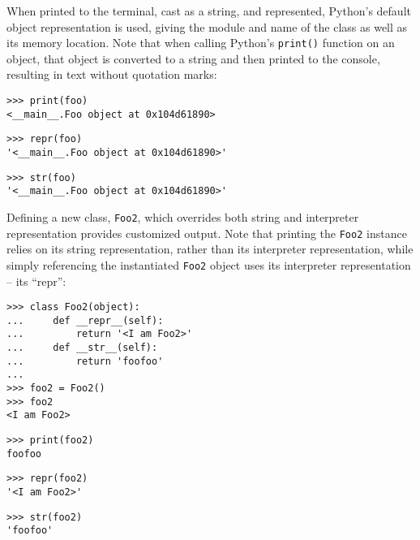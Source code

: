 \noindent When printed to the terminal, cast as a string, and represented,
Python's default object representation is used, giving the module and name of
the class as well as its memory location. Note that when calling Python's
\texttt{print()} function on an object, that object is converted to a string
and then printed to the console, resulting in text without quotation marks:

\begin{comment}
<abjad>
print(foo)
repr(foo)
str(foo)
</abjad>
\end{comment}

\begin{abjadbookoutput}
\begin{singlespacing}
\vspace{-0.5\baselineskip}
\begin{verbatim}
>>> print(foo)
<__main__.Foo object at 0x104d61890>
\end{verbatim}
\begin{verbatim}
>>> repr(foo)
'<__main__.Foo object at 0x104d61890>'
\end{verbatim}
\begin{verbatim}
>>> str(foo)
'<__main__.Foo object at 0x104d61890>'
\end{verbatim}
\end{singlespacing}
\end{abjadbookoutput}

\noindent Defining a new class, \texttt{Foo2}, which overrides both string and
interpreter representation provides customized output. Note that printing the
\texttt{Foo2} instance relies on its string representation, rather than its
interpreter representation, while simply referencing the instantiated
\texttt{Foo2} object uses its interpreter representation -- its \enquote{repr}:

\begin{comment}
<abjad>
class Foo2(object):
    def __repr__(self):
        return '<I am Foo2>'
    def __str__(self):
        return 'foofoo'

foo2 = Foo2()
foo2
print(foo2)
repr(foo2)
str(foo2)
</abjad>
\end{comment}

\begin{abjadbookoutput}
\begin{singlespacing}
\vspace{-0.5\baselineskip}
\begin{verbatim}
>>> class Foo2(object):
...     def __repr__(self):
...         return '<I am Foo2>'
...     def __str__(self):
...         return 'foofoo'
...
>>> foo2 = Foo2()
>>> foo2
<I am Foo2>
\end{verbatim}
\begin{verbatim}
>>> print(foo2)
foofoo
\end{verbatim}
\begin{verbatim}
>>> repr(foo2)
'<I am Foo2>'
\end{verbatim}
\begin{verbatim}
>>> str(foo2)
'foofoo'
\end{verbatim}
\end{singlespacing}
\end{abjadbookoutput}

